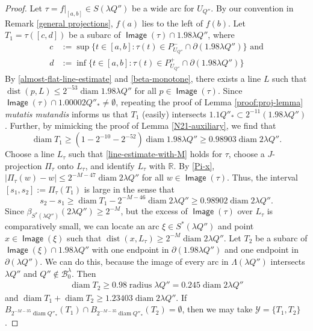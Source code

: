 \documentclass[12pt]{amsart}
\numberwithin{equation}{section}
\theoremstyle{plain}
\theoremstyle{definition}
\def\RR{\mathbb{R}}
\newcommand{\radius}{\mathop\mathrm{radius}\nolimits}
\newcommand{\diam}{\mathop\mathrm{diam}\nolimits}
\newcommand{\dist}{\mathop\mathrm{dist}\nolimits}
\newcommand{\Image}{\mathop\mathsf{Image}\nolimits}
\numberwithin{figure}{section}
\begin{document}
\begin{proof} Let $\tau=f|_{[a,b]}\in S(\lambda Q'')$ be a wide arc for $U_{Q''}$. By our convention in Remark \ref{general projections}, $f(a)$ lies to the left of $f(b)$. Let $T_1=\tau([c,d])$ be a subarc of $\Image(\tau)\cap 1.98\lambda Q''$, where \begin{align*}
c&:=\sup\{t\in[a,b]:\tau(t)\in P_{U_{Q''}}^-\cap\partial(1.98\lambda Q'')\}\text{ and}\\
d&:=\inf\{t\in[a,b]:\tau(t)\in P_{U_{Q''}}^+\cap\partial(1.98\lambda Q'')\}\end{align*} By \eqref{almost-flat-line-estimate} and \eqref{beta-monotone}, there exists a line $L$ such that $\dist(p,L)\leq 2^{-53}\diam 1.98\lambda Q''$ for all $p\in\Image(\tau)$. Since $\Image(\tau)\cap 1.00002Q''_*\neq\emptyset$, repeating the proof of Lemma \ref{proof:proj-lemma} \emph{mutatis mutandis} informs us that $T_1$ (easily) intersects $1.1Q''_*\subset 2^{-11}(1.98\lambda Q'')$. Further, by mimicking the proof of Lemma \ref{N21-auxiliary}, we find that $$\diam T_1\geq (1-2^{-10}-2^{-52})\diam 1.98\lambda Q''\geq 0.98903\diam 2\lambda Q''.$$ Choose a line $L_\tau$ such that \eqref{line-estimate-with-M} holds for $\tau$, choose a $J$-projection $\Pi_\tau$ onto $L_\tau$, and identify $L_\tau$ with $\RR$. By \eqref{Pi-x}, $|\Pi_\tau(w)-w|\leq 2^{-M-47}\diam 2\lambda Q''$ for all $w\in\Image(\tau)$. Thus, the interval $[s_1,s_2]:=\Pi_\tau(T_1)$ is large in the sense that $$s_2-s_1\geq \diam T_1 - 2^{-M-46}\diam 2\lambda Q''\geq 0.98902\diam 2\lambda Q''.$$ Since $\beta_{S^*(\lambda Q'')}(2\lambda Q'')\geq 2^{-M}$, but the excess of $\Image(\tau)$ over $L_\tau$ is comparatively small, we can locate an arc $\xi\in S^*(\lambda Q'')$ and point $x\in \Image(\xi)$ such that $\dist(x,L_\tau)\geq 2^{-M}\diam 2\lambda Q''$. Let $T_2$ be a subarc of $\Image(\xi)\cap 1.98\lambda Q''$ with one endpoint in $\partial(1.98\lambda Q'')$ and one endpoint in $\partial(\lambda Q'')$. We can do this, because the image of every arc in $\Lambda(\lambda Q'')$ intersects $\lambda Q''$ and $Q''\not\in\mathscr{B}^\lambda_0$. Then
\begin{align}\label{big ball T_2 diameter estimate}
    \diam T_2\geq 0.98\radius \lambda Q''=0.245\diam 2\lambda Q''
\end{align} and $\diam T_1+\diam T_2\geq 1.23403\diam 2\lambda Q''.$ If $B_{2^{-M-35}\diam Q''_*}(T_1)\cap B_{2^{-M-35}\diam Q''_*}(T_2)=\emptyset$, then we may take $\mathcal{Y}=\{T_1,T_2\}$.


\end{proof}
\end{document}
